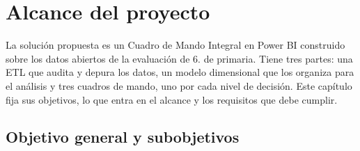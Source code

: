 \documentclass[12pt, a4paper, oneside]{report}
\begin{document}
\chapter{Alcance del proyecto}
\label{cap:alcance}
La solución propuesta es un Cuadro de Mando Integral en Power BI construido sobre los datos abiertos de la evaluación de 6.\textordmasculine{} de primaria. Tiene tres partes: una ETL que audita y depura los datos, un modelo dimensional que los organiza para el análisis y tres cuadros de mando, uno por cada nivel de decisión. Este capítulo fija sus objetivos, lo que entra en el alcance y los requisitos que debe cumplir.

\section{Objetivo general y subobjetivos}
\end{document}
